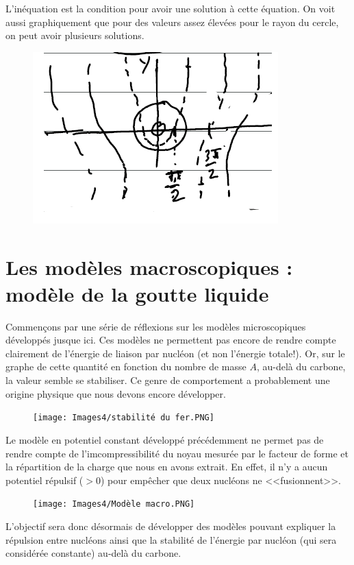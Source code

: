 L'inéquation est la condition pour avoir une solution à cette équation. On voit aussi graphiquement que pour des valeurs assez élevées pour le rayon du cercle, on peut avoir plusieurs solutions.
\begin{figure}[H]
    \centering
    \includegraphics[scale=1.2]{Images4/EqTranscendante.PNG}
\end{figure}







\section{Les modèles macroscopiques : modèle de la goutte liquide}


Commençons par une série de réflexions sur les modèles microscopiques développés jusque ici. Ces modèles ne permettent pas encore de rendre compte clairement de l'énergie de liaison par nucléon (et non l'énergie totale!). Or, sur le graphe de cette quantité en fonction du nombre de masse $A$, au-delà du carbone, la valeur semble se stabiliser. Ce genre de comportement a probablement une origine physique que nous devons encore développer.\\ 
\begin{figure}[H]
    \centering
    \texttt{[image: Images4/stabilité du fer.PNG]}
\end{figure}
Le modèle en potentiel constant développé précédemment ne permet pas de rendre compte de l'imcompressibilité du noyau mesurée par le facteur de forme et la répartition de la charge que nous en avons extrait. En effet, il n'y a aucun potentiel répulsif ($>0$) pour empêcher que deux nucléons ne <<fusionnent>>.\\
\begin{figure}[H]
    \centering
    \texttt{[image: Images4/Modèle macro.PNG]}
\end{figure}
L'objectif sera donc désormais de développer des modèles pouvant expliquer la répulsion entre nucléons ainsi que la stabilité de l'énergie par nucléon (qui sera considérée constante) au-delà du carbone.


